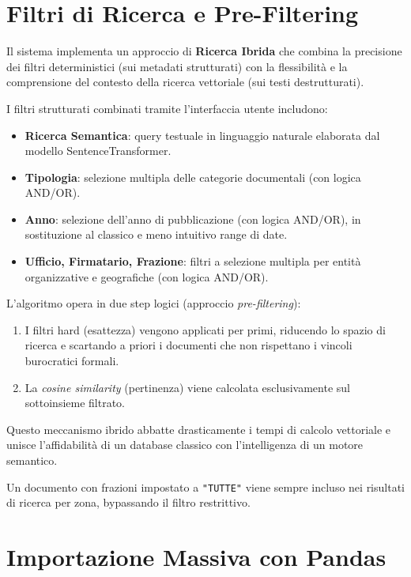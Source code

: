 \documentclass[12pt,a4paper,oneside]{report}
\begin{document}
\section{Filtri di Ricerca e Pre-Filtering}

Il sistema implementa un approccio di \textbf{Ricerca Ibrida} che combina la precisione dei filtri deterministici (sui metadati strutturati) con la flessibilit\`{a} e la comprensione del contesto della ricerca vettoriale (sui testi destrutturati).

I filtri strutturati combinati tramite l'interfaccia utente includono:
\begin{itemize}
    \item \textbf{Ricerca Semantica}: query testuale in linguaggio naturale elaborata dal modello SentenceTransformer.
    \item \textbf{Tipologia}: selezione multipla delle categorie documentali (con logica AND/OR).
    \item \textbf{Anno}: selezione dell'anno di pubblicazione (con logica AND/OR), in sostituzione al classico e meno intuitivo range di date.
    \item \textbf{Ufficio, Firmatario, Frazione}: filtri a selezione multipla per entit\`{a} organizzative e geografiche (con logica AND/OR).
\end{itemize}

L'algoritmo opera in due step logici (approccio \textit{pre-filtering}):
\begin{enumerate}
    \item I filtri hard (esattezza) vengono applicati per primi, riducendo lo spazio di ricerca e scartando a priori i documenti che non rispettano i vincoli burocratici formali.
    \item La \textit{cosine similarity} (pertinenza) viene calcolata esclusivamente sul sottoinsieme filtrato.
\end{enumerate}
Questo meccanismo ibrido abbatte drasticamente i tempi di calcolo vettoriale e unisce l'affidabilit\`{a} di un database classico con l'intelligenza di un motore semantico.

\begin{notabox}[title={Wildcard Frazioni}]
Un documento con frazioni impostato a \texttt{"TUTTE"} viene sempre incluso
nei risultati di ricerca per zona, bypassando il filtro restrittivo.
\end{notabox}

\section{Importazione Massiva con Pandas}
\end{document}
